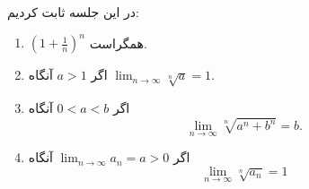 \documentclass[12pt,a4paper]{article}
\theoremstyle{definition}
\begin{document}
\begin{framed}
در این جلسه ثابت کردیم:
\begin{enumerate}
\item 
$(1+\frac{1}{n})^n$
همگراست.
\item 
اگر
$a>1$
آنگاه
$\lim_{n\to \infty} \sqrt[n]{a}=1$.
\item 
اگر 
$0<a<b$
آنگاه
\[
\lim_{n \to \infty}\sqrt[n]{a^n+b^n}=b.
\]
\item 
 اگر 
$\lim_{n \to \infty}a_n=a>0$
آنگاه 
\[
\lim_{n \to \infty}\sqrt[n]{a_n}=1
\]
\end{enumerate}

\end{framed}
\end{document}
